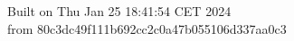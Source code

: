 {\noindent Built on Thu Jan 25 18:41:54 CET 2024} \\ 
 {\noindent from 80c3dc49f111b692cc2c0a47b055106d337aa0c3}
